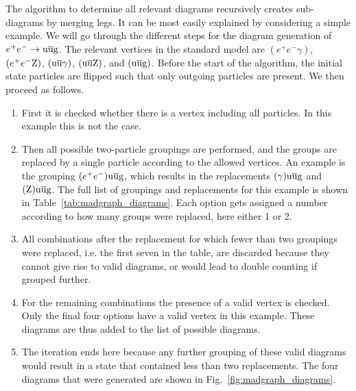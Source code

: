 The algorithm to determine all relevant diagrams recursively creates sub-diagrams by merging legs.
It can be most easily explained by considering a simple example. We will go through the different
steps for the diagram generation of $e^+ e^- \rightarrow \mathrm{u} \overline{\mathrm{u}} \mathrm{g}$. The relevant vertices
in the standard model are $(e^+ e^- \gamma)$, $(e^+ e^- \mathrm{Z})$, $(\mathrm{u} \overline{\mathrm{u}} \gamma)$, $(\mathrm{u}
\overline{\mathrm{u}} \mathrm{Z})$, and $(\mathrm{u} \overline{\mathrm{u}} \mathrm{g})$. Before the start of the algorithm, the initial state
particles are flipped such that only outgoing particles are present. We then proceed as follows.
\begin{enumerate}
  \item  First it is checked whether there is a vertex including all particles. In this example
this is not the case. 
  \item Then all possible two-particle groupings are performed, and the groups are replaced by a
single particle according to the allowed vertices. An example is the grouping $(e^+ e^-) \mathrm{u}
\overline{\mathrm{u}} \mathrm{g}$, which results in the replacements $(\gamma) \mathrm{u} \overline{\mathrm{u}} \mathrm{g}$ and $(\mathrm{Z}) \mathrm{u}
\overline{\mathrm{u}} \mathrm{g}$. The full list of groupings and replacements for this example is shown in
Table~\ref{tab:madgraph_diagrams}. Each option gets assigned a number according to how many groups
were replaced, here either 1 or 2. 
  \item All combinations after the replacement for which fewer than two groupings were replaced,
i.e. the first seven in the table, are discarded because they cannot give rise to valid diagrams, or
would lead to double counting if grouped further. 
  \item For the remaining combinations the presence of a valid vertex is checked. Only the final
four options have a valid vertex in this example. These diagrams are thus added to the list of
possible diagrams. 
  \item The iteration ends here because any further grouping of these valid diagrams would result
in a state that contained less than two replacements. The four diagrams that were generated are
shown in Fig.~\ref{fig:madgraph_diagrams}.
\end{enumerate}


